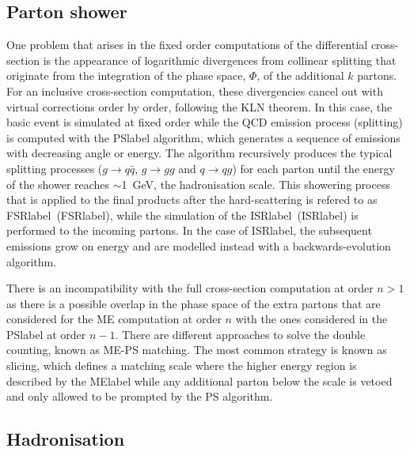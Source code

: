 \subsection{Parton shower}

One problem that arises in the fixed order computations of the differential cross-section is the appearance of logarithmic divergences from collinear splitting that originate from the integration of the phase space, $\Phi$, of the additional $k$ partons. For an inclusive cross-section computation, these divergencies cancel out with virtual corrections order by order, following the KLN theorem. %
In this case, the basic event is simulated at fixed order while the \acrshort{QCD} emission process (splitting) is computed with the \acrshort{PSlabel} algorithm, %
which generates a sequence of emissions with decreasing angle or energy. The algorithm recursively produces the typical splitting processes ($g\to q\bar{q}$, $g\to gg$ and $q\to qg$) for each parton until the energy of the shower reaches $\sim$1~GeV, the hadronisation scale. This showering process that is applied to the final products after the hard-scattering is refered to as \acrlong{FSRlabel}~(\acrshort{FSRlabel}), while the simulation of the \acrlong{ISRlabel}~(\acrshort{ISRlabel}) is performed to the incoming partons. In the case of \acrshort{ISRlabel}, the subsequent emissions grow on energy and are modelled instead with a backwards-evolution algorithm. %

There is an incompatibility with the full cross-section computation at order $n>1$ as there is a possible overlap in the phase space of the extra partons that are considered for the \acrshort{ME} computation at order $n$ with the ones considered in the \acrshort{PSlabel} at order $n-1$. There are different approaches to solve the double counting, known as ME-PS matching. The most common strategy is known as slicing, which defines a matching scale where the higher energy region is described by the \acrshort{MElabel} while any additional parton below the scale is vetoed and only allowed to be prompted by the \acrshort{PS} algorithm.

\subsection{Hadronisation}



